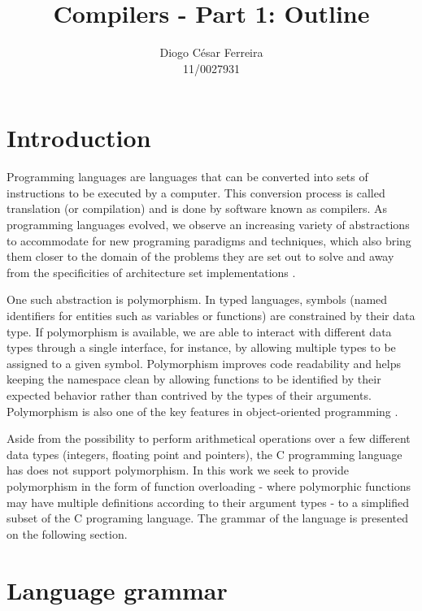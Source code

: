 \documentclass[11pt]{article}
\begin{document}
\title{Compilers - Part 1: Outline }
\author{Diogo César Ferreira\\11/0027931}
\maketitle

\section{Introduction}
Programming languages are languages that can be converted into sets of instructions to be executed by a computer. This conversion process is called translation (or compilation) and is done by software known as compilers. As programming languages evolved, we observe an increasing variety of abstractions to accommodate for new programing paradigms and techniques, which also bring them closer to the domain of the problems they are set out to solve and away from the specificities of architecture set implementations \cite{Aho2007}.

One such abstraction is polymorphism. In typed languages, symbols (named identifiers for entities such as variables or functions) are constrained by their data type. If polymorphism is available, we are able to interact with different data types through a single interface, for instance, by allowing multiple types to be assigned  to a given symbol. Polymorphism improves code readability and helps keeping the namespace clean by allowing functions to be identified by their expected behavior rather than contrived by the types of their arguments. Polymorphism is also one of the key features in object-oriented programming \cite{Aho2007, Strachey2000}.

Aside from the possibility to perform arithmetical operations over a few different data types (integers, floating point and pointers), the C programming language has does not support polymorphism. In this work we seek to provide polymorphism in the form of function overloading - where polymorphic functions may have multiple definitions according to their argument types - to a simplified subset of the C programing language. The grammar of the language is presented on the following section.


\section{Language grammar}
\end{document}
